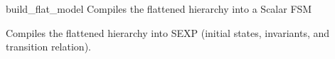 \begin{nusmvCommand} {build\_flat\_model} {Compiles the flattened hierarchy
    into a Scalar FSM}


Compiles the flattened hierarchy into SEXP (initial states,
invariants, and transition relation).
\end{nusmvCommand}
